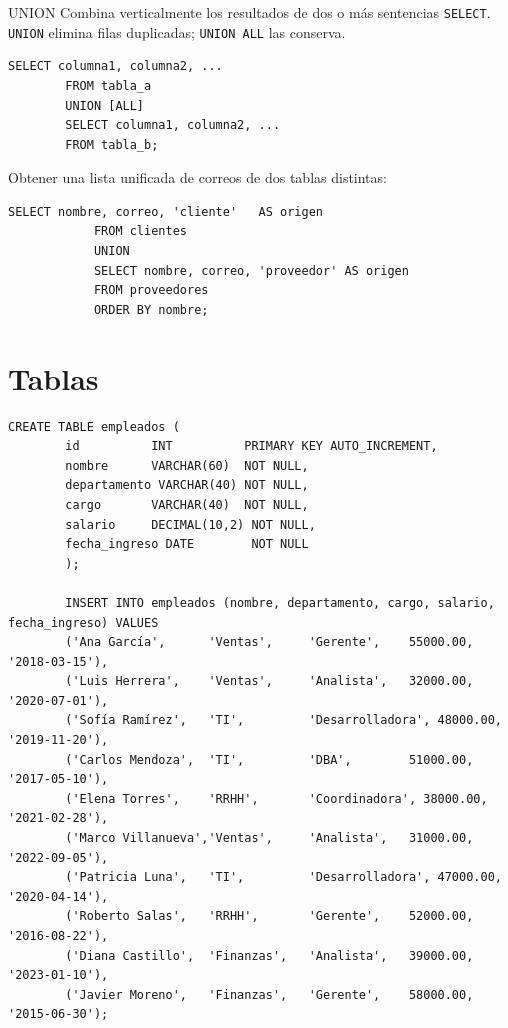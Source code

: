 \documentclass[12pt, a4paper]{article}
\begin{document}
	\begin{definicion}{UNION}
		Combina verticalmente los resultados de dos o más sentencias \texttt{SELECT}.
		\texttt{UNION} elimina filas duplicadas; \texttt{UNION ALL} las conserva.
	\end{definicion}
	
	\begin{lstlisting}[style=sql, caption={Sintaxis de UNION / UNION ALL}]
		SELECT columna1, columna2, ...
		FROM tabla_a
		UNION [ALL]
		SELECT columna1, columna2, ...
		FROM tabla_b;
	\end{lstlisting}
	
	\begin{ejemplo}
		Obtener una lista unificada de correos de dos tablas distintas:
		
		\begin{lstlisting}[style=sql, caption={UNION de correos de clientes y proveedores}]
			SELECT nombre, correo, 'cliente'   AS origen
			FROM clientes
			UNION
			SELECT nombre, correo, 'proveedor' AS origen
			FROM proveedores
			ORDER BY nombre;
		\end{lstlisting}
	\end{ejemplo}
	

	\newpage
    \section*{Tablas}
    	\begin{lstlisting}[caption={Creación e inicialización de la tabla \texttt{empleados}.}]
		CREATE TABLE empleados (
		id          INT          PRIMARY KEY AUTO_INCREMENT,
		nombre      VARCHAR(60)  NOT NULL,
		departamento VARCHAR(40) NOT NULL,
		cargo       VARCHAR(40)  NOT NULL,
		salario     DECIMAL(10,2) NOT NULL,
		fecha_ingreso DATE        NOT NULL
		);
		
		INSERT INTO empleados (nombre, departamento, cargo, salario, fecha_ingreso) VALUES
		('Ana García',      'Ventas',     'Gerente',    55000.00, '2018-03-15'),
		('Luis Herrera',    'Ventas',     'Analista',   32000.00, '2020-07-01'),
		('Sofía Ramírez',   'TI',         'Desarrolladora', 48000.00, '2019-11-20'),
		('Carlos Mendoza',  'TI',         'DBA',        51000.00, '2017-05-10'),
		('Elena Torres',    'RRHH',       'Coordinadora', 38000.00, '2021-02-28'),
		('Marco Villanueva','Ventas',     'Analista',   31000.00, '2022-09-05'),
		('Patricia Luna',   'TI',         'Desarrolladora', 47000.00, '2020-04-14'),
		('Roberto Salas',   'RRHH',       'Gerente',    52000.00, '2016-08-22'),
		('Diana Castillo',  'Finanzas',   'Analista',   39000.00, '2023-01-10'),
		('Javier Moreno',   'Finanzas',   'Gerente',    58000.00, '2015-06-30');
	\end{lstlisting}
\end{document}
